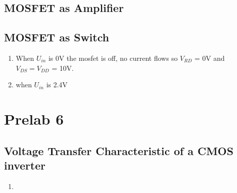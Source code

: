 \documentclass{article}
\begin{document}
		\subsection{MOSFET as Amplifier}
		\subsection{MOSFET as Switch}
		\begin{enumerate}
			\item When \(U_{in}\) is 0V the mosfet is off, no current flows so \(V_{RD}\) = 0V and \(V_{DS} = V_{DD}\) = 10V.
			\item  when \(U_{in}\) is 2.4V 
		\end{enumerate}
	\section{Prelab 6}
		\subsection{ Voltage Transfer Characteristic of a CMOS inverter}
			\begin{enumerate}
				\item 
			\end{enumerate}	
\end{document}
